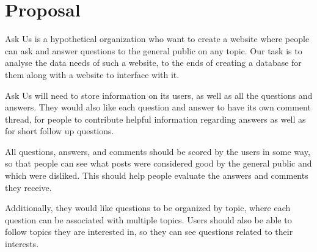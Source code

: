 \section{Proposal}

Ask Us is a hypothetical organization who want to create a website where people can ask and answer questions to the general public on any topic. Our task is to analyse the data needs of such a website, to the ends of creating a database for them along with a website to interface with it.

Ask Us will need to store information on its users, as well as all the questions and answers. They would also like each question and answer to have its own comment thread, for people to contribute helpful information regarding answers as well as for short follow up questions.

All questions, answers, and comments should be scored by the users in some way, so that people can see what posts were considered good by the general public and which were disliked. This should help people evaluate the answers and comments they receive.

Additionally, they would like questions to be organized by topic, where each question can be associated with multiple topics. Users should also be able to follow topics they are interested in, so they can see questions related to their interests.